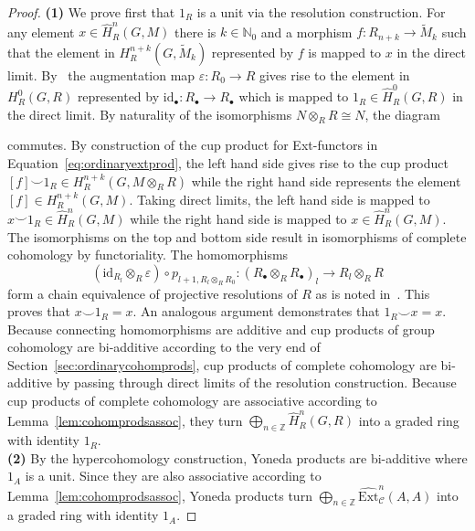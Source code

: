 \documentclass[12pt, a4paper]{article}
\numberwithin{equation}{section}
\theoremstyle{empty}
\theoremstyle{nonumberplain}
\newtheorem{proof}{Proof}
\begin{document}
\begin{proof}
\textbf{(1)} We prove first that $1_R$ is a unit via the resolution construction. For any element $x \in \widehat{H}_R^n(G, M)$ there is $k \in \mathbb{N}_0$ and a morphism $f: R_{n+k} \rightarrow \widetilde{M}_k$ such that the element in $H_R^{n+k}(G, \widetilde{M}_k)$ represented by $f$ is mapped to $x$ in the direct limit. By~\cite[Proposition~6.7]{ghe24} the augmentation map $\varepsilon: R_0 \rightarrow R$ gives rise to the element in $H_R^0(G, R)$ represented by $\mathrm{id}_{\bullet}: R_{\bullet} \rightarrow R_{\bullet}$ which is mapped to $1_R \in \widehat{H}_R^0(G, R)$ in the direct limit. By naturality of the isomorphisms $N \otimes_R R \cong N$, the diagram
\begin{center}
\end{center}
commutes. By construction of the cup product for Ext-functors in Equation~\ref{eq:ordinaryextprod}, the left hand side gives rise to the cup product $[f] \smile 1_R \in H_R^{n+k}(G, M \otimes_R R)$ while the right hand side represents the element $[f] \in H_R^{n+k}(G, M)$. Taking direct limits, the left hand side is mapped to $x \smile 1_R \in \widehat{H}_R^n(G, M)$ while the right hand side is mapped to $x \in \widehat{H}_R^n(G, M)$. The isomorphisms on the top and bottom side result in isomorphisms of complete cohomology by functoriality. The homomorphisms
\[ (\mathrm{id}_{R_l} \otimes_R \varepsilon) \circ p_{l+1, R_l \otimes_R R_0}: (R_{\bullet} \otimes_R R_{\bullet})_l \rightarrow R_l \otimes_R R \]
form a chain equivalence of projective resolutions of $R$ as is noted in~\cite[p.~111]{bro82}. This proves that $x \smile 1_R = x$. An analogous argument demonstrates that $1_R \smile x = x$. Because connecting homomorphisms are additive and cup products of group cohomology are bi-additive according to the very end of Section~\ref{sec:ordinarycohomprods}, cup products of complete cohomology are bi-additive by passing through direct limits of the resolution construction. Because cup products of complete cohomology are associative according to Lemma~\ref{lem:cohomprodsassoc}, they turn $\bigoplus_{n \in \mathbb{Z}} \widehat{H}_R^n(G, R)$ into a graded ring with identity $1_R$. \\

\textbf{(2)}  By the hypercohomology construction, Yoneda products are bi-additive where $1_A$ is a unit. Since they are also associative according to Lemma~\ref{lem:cohomprodsassoc}, Yoneda products turn $\bigoplus_{n \in \mathbb{Z}} \widehat{\mathrm{Ext}}_{\mathcal{C}}^n(A, A)$ into a graded ring with identity $1_A$.
\end{proof}
\end{document}
